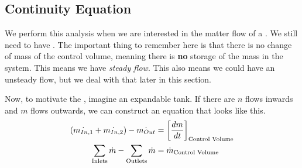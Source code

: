 \subsection{Continuity Equation}\label{subsec:Continuity_Equation}
We perform this analysis when we are interested in the matter flow of a .
We still need to have .
The important thing to remember here is that there is no change of mass of the control volume, meaning there is \textbf{no} storage of the mass in the system.
This means we have \emph{steady flow}.
This also means we could have an unsteady flow, but we deal with that later in this section.

Now, to motivate the , imagine an expandable tank.
If there are $n$ flows inwards and $m$ flows outwards, we can construct an equation that looks like this.
\begin{align*}
  (\dot{m_{In,1}} + \dot{m_{In,2}}) - \dot{m_{Out}} &= {\left[ \frac{dm}{dt} \right]}_{\text{Control Volume}} \\
  \sum\limits_{\text{Inlets}} \dot{m} - \sum\limits_{\text{Outlets}} \dot{m} &= \dot{m}_{\text{Control Volume}}
\end{align*}

